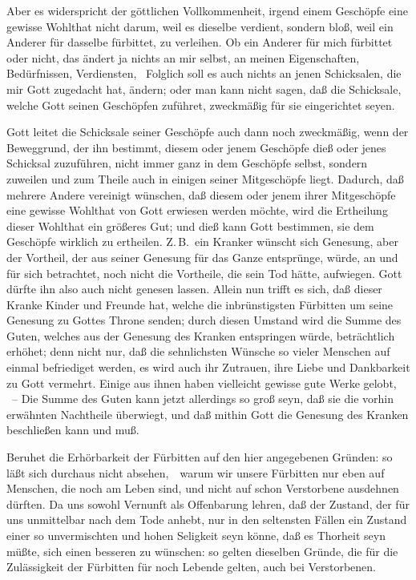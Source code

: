 \begin{aufza}
 Aber es widerspricht der göttlichen Vollkommenheit, irgend einem Geschöpfe eine gewisse Wohlthat nicht darum, weil es dieselbe verdient, sondern bloß, weil ein Anderer für dasselbe fürbittet, zu verleihen. Ob ein Anderer für mich fürbittet oder nicht, das ändert ja nichts an mir selbst, an meinen Eigenschaften, Bedürfnissen, Verdiensten, \usw\ Folglich soll es auch nichts an jenen Schicksalen, die mir Gott zugedacht hat, ändern; oder man kann nicht sagen, daß die Schicksale, welche Gott seinen Geschöpfen zuführet, zweckmäßig für sie eingerichtet seyen.\par
{} Gott leitet die Schicksale seiner Geschöpfe auch dann noch zweckmäßig, wenn der Beweggrund, der ihn bestimmt, diesem oder jenem Geschöpfe dieß oder jenes Schicksal zuzuführen, nicht immer ganz in dem Geschöpfe selbst, sondern zuweilen und zum Theile auch in einigen seiner Mitgeschöpfe liegt. Dadurch, daß mehrere Andere vereinigt wünschen, daß diesem oder jenem ihrer Mitgeschöpfe eine gewisse Wohlthat von Gott erwiesen werden möchte, wird die Ertheilung dieser Wohlthat ein größeres Gut; und dieß kann Gott bestimmen, sie dem Geschöpfe wirklich zu ertheilen. Z.\,B.\ ein Kranker wünscht sich Genesung, aber der Vortheil, der aus seiner Genesung für das Ganze entsprünge, würde, an und für sich betrachtet, noch nicht die Vortheile, die sein Tod hätte, aufwiegen. Gott dürfte ihn also auch nicht genesen lassen. Allein nun trifft es sich, daß dieser Kranke Kinder und Freunde hat, welche die inbrünstigsten Fürbitten um seine Genesung zu Gottes Throne senden; durch diesen Umstand wird die Summe des Guten, welches aus der Genesung des Kranken entspringen würde, beträchtlich erhöhet; denn nicht nur, daß die sehnlichsten Wünsche so vieler Menschen auf einmal befriediget werden, es wird auch ihr Zutrauen, ihre Liebe und Dankbarkeit zu Gott vermehrt. Einige aus ihnen haben vielleicht gewisse gute Werke gelobt, \usw\ -- Die Summe des Guten kann jetzt allerdings so groß seyn, daß sie die vorhin erwähnten Nachtheile überwiegt, und daß mithin Gott die Genesung des Kranken beschließen kann und muß.
\item Beruhet die Erhörbarkeit der Fürbitten auf den hier angegebenen Gründen: so läßt sich durchaus nicht absehen,~\ warum wir unsere Fürbitten nur eben auf Menschen, die noch am Leben sind, und nicht auf schon Verstorbene ausdehnen dürften. Da uns sowohl Vernunft als Offenbarung lehren, daß der Zustand, der für uns unmittelbar nach dem Tode anhebt, nur in den seltensten Fällen ein Zustand einer so unvermischten und hohen Seligkeit seyn könne, daß es Thorheit seyn müßte, sich einen besseren zu wünschen: so gelten dieselben Gründe, die für die Zulässigkeit der Fürbitten für noch Lebende gelten, auch bei Verstorbenen.

\end{aufza}
